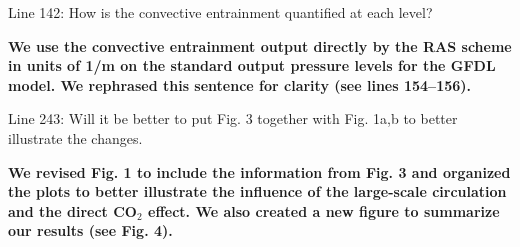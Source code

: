 \documentclass[11pt]{article}
\begin{document}
Line 142: How is the convective entrainment quantified at each level?

\textbf{We use the convective entrainment output directly by the RAS scheme in units of 1/m on the standard output pressure levels for the GFDL model. We rephrased this sentence for clarity (see lines 154--156).}

Line 243: Will it be better to put Fig. 3 together with Fig. 1a,b to better illustrate the changes.

\textbf{We revised Fig. 1 to include the information from Fig. 3 and organized the plots to better illustrate the influence of the large-scale circulation and the direct CO\(_2\) effect. We also created a new figure to summarize our results (see Fig. 4).}



\end{document}
